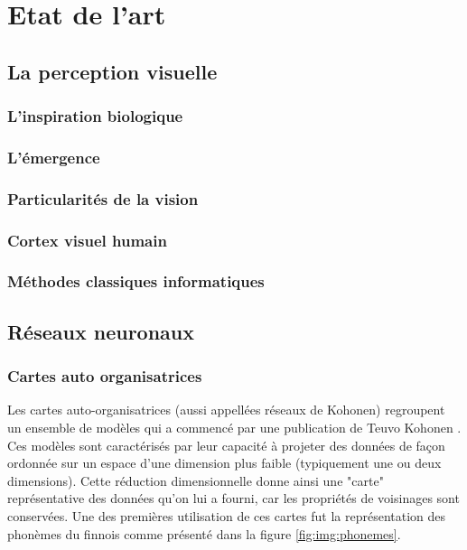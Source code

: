 \chapter{Etat de l'art}
	\minitoc
	\newpage






\section{La perception visuelle}
\subsection{L'inspiration biologique}
\subsection{L'émergence}
\subsection{Particularités de la vision}
\subsection{Cortex visuel humain}
\subsection{Méthodes classiques informatiques}

\newpage
\section{Réseaux neuronaux}
\subsection{Cartes auto organisatrices}

	Les cartes auto-organisatrices (aussi appellées réseaux de Kohonen) regroupent un ensemble de modèles qui a commencé par une publication de Teuvo Kohonen \cite{kohonen-som82}. Ces modèles sont caractérisés par leur capacité à projeter des données de façon ordonnée sur un espace d'une dimension plus faible (typiquement une ou deux dimensions). Cette réduction dimensionnelle donne ainsi une "carte" représentative des données qu'on lui a fourni, car les propriétés de voisinages sont conservées. Une des premières utilisation de ces cartes fut la représentation des phonèmes du finnois comme présenté dans la figure \ref{fig:img:phonemes}.

